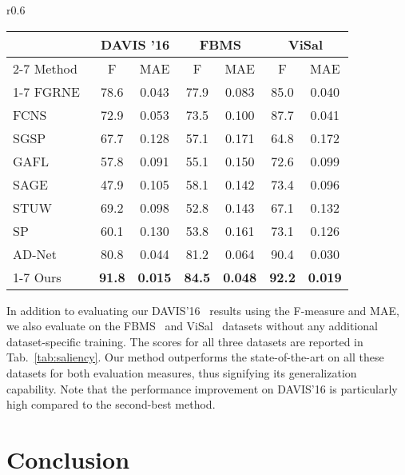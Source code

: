 \documentclass{bmvc2k}
\begin{document}
\begin{wraptable}{r}{0.6\textwidth}
\vspace{-5mm}
\footnotesize
\setlength{\tabcolsep}{4pt} \centering
{}
\begin{tabular}{l|cc |cc|cc}
\toprule
 &\multicolumn{2}{c|}{DAVIS '16} & \multicolumn{2}{c|}{FBMS} & \multicolumn{2}{c}{ViSal} \\
 \cmidrule(lr){2-7}
 Method & F & MAE & F & MAE & F & MAE \\
\cmidrule(lr){1-7}
FGRNE~\cite{Li18CVPR} & 78.6 & 0.043 & 77.9 & 0.083& 85.0 & 0.040\\ 
FCNS~\cite{Wang17TIP} & 72.9 & 0.053& 73.5& 0.100& 87.7& 0.041 \\
SGSP~\cite{Liu16TCSVT} & 67.7& 0.128& 57.1&  0.171& 64.8&  0.172 \\
GAFL~\cite{Wang15TIP} & 57.8 & 0.091& 55.1&  0.150& 72.6&  0.099 \\
SAGE~\cite{Wang15CVPR} & 47.9& 0.105& 58.1&  0.142& 73.4&  0.096 \\
STUW~\cite{Fang14TIP} & 69.2& 0.098& 52.8&  0.143& 67.1& 0.132\\
SP~\cite{Liu14TCSVT}   & 60.1&0.130&53.8&0.161&73.1&0.126\\
AD-Net~\cite{Yang19ICCVAnchorDiff} & 80.8 &0.044  &81.2 & 0.064  &90.4 &0.030 \\
\cmidrule(lr){1-7}
Ours&  \textbf{91.8} &\textbf{0.015}& \textbf{84.5} & \textbf{0.048} & \textbf{92.2} & \textbf{0.019}\\
\bottomrule
\end{tabular}
\caption{\label{tab:evaltable2} F-measure and MAE for DAVIS, FBMS and ViSal datasets. : Higher is better, : Lower is better.}
\label{tab:saliency}
\vspace{-2mm}
\end{wraptable} 
In addition to evaluating our DAVIS'16~\cite{PontTuset17arxiv} results using the F-measure and MAE, we also evaluate on the FBMS~\cite{Ochs13TPAMI} and ViSal~\cite{Wang15TIP} datasets without any additional dataset-specific training. The scores for all three datasets are reported in Tab.~\ref{tab:saliency}. Our method outperforms the state-of-the-art on all these datasets for both evaluation measures, thus signifying its generalization capability. Note that the performance improvement on DAVIS'16 is particularly high compared to the second-best method.
 
\section{Conclusion}
\end{document}
